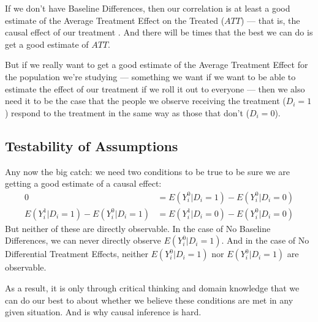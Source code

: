 \documentclass[letterpaper,10pt,english]{jupyterBook}
\begin{document}
\sphinxAtStartPar
If we don’t have Baseline Differences, then our correlation is at least a good estimate of the Average Treatment Effect on the Treated (\(ATT\)) — that is, the causal effect of our treatment . And there will be times that the best we can do is get a good estimate of \(ATT\).

\sphinxAtStartPar
But if we really want to get a good estimate of the Average Treatment Effect for the  population we’re studying — something we want if we want to be able to estimate the effect of our treatment if we roll it out to everyone — then we also need it to be the case that the people we observe receiving the treatment (\(D_i = 1\)) respond to the treatment in the same way as those that don’t (\(D_i = 0\)).


\subsection{Testability of Assumptions}
\label{\detokenize{35_causal/10_potential_outcomes:testability-of-assumptions}}
\sphinxAtStartPar
Any now the big catch: we need two conditions to be true to be sure we are getting a good estimate of a causal effect:
\begin{equation*}
\begin{split}
0 & = E(Y^0_i|D_i = 1) - E(Y_i^0|D_i = 0)\\
E(Y^1_i|D_i = 1) - E(Y_i^0|D_i = 1) &= E(Y^1_i|D_i = 0) - E(Y_i^0|D_i = 0)
\end{split}
\end{equation*}
\sphinxAtStartPar
But neither of these are directly observable. In the case of No Baseline Differences, we can never directly observe \(E(Y^0_i|D_i = 1)\). And in the case of No Differential Treatment Effects, neither \(E(Y_i^0|D_i = 1)\) nor \(E(Y_i^0|D_i = 1)\) are observable.

\sphinxAtStartPar
As a result, it is only through critical thinking and domain knowledge that we can do our best to  about whether we believe these conditions are met in any given situation. And  is why causal inference is hard.







\renewcommand{\indexname}{Index}
\printindex
\end{document}
